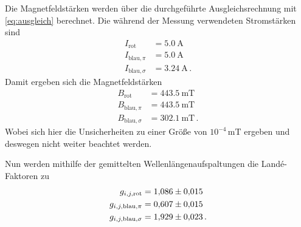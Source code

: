 Die Magnetfeldstärken werden über die durchgeführte Ausgleichsrechnung mit \autoref{eq:ausgleich} berechnet.
Die während der Messung verwendeten Stromstärken sind
\begin{align*}
    I_{\text{rot}} &= \SI{5.0}{\ampere} \\
    I_{\text{blau},\pi} &= \SI{5.0}{\ampere} \\
    I_{\text{blau},\sigma} &= \SI{3.24}{\ampere} \, .
\end{align*}
Damit ergeben sich die Magnetfeldstärken 
\begin{align*}
    B_{\text{rot}} &= \SI{443.5}{\milli\tesla} \\
    B_{\text{blau},\pi} &= \SI{443.5}{\milli\tesla} \\
    B_{\text{blau},\sigma} &= \SI{302.1}{\milli\tesla} \, .
\end{align*}
Wobei sich hier die Unsicherheiten zu einer Größe von $10^{-4}\,\si{\milli\tesla}$ ergeben und deswegen nicht weiter beachtet werden.

Nun werden mithilfe der gemittelten Wellenlängenaufspaltungen die Landé-Faktoren zu
\begin{align*}
    g_{i,j,\text{rot}} &= \num{1.086+-0.015} \\
    g_{i,j,\text{blau},\pi} &= \num{0.607+-0.015} \\
    g_{i,j,\text{blau},\sigma} &= \num{1.929+-0.023} \, .
\end{align*}